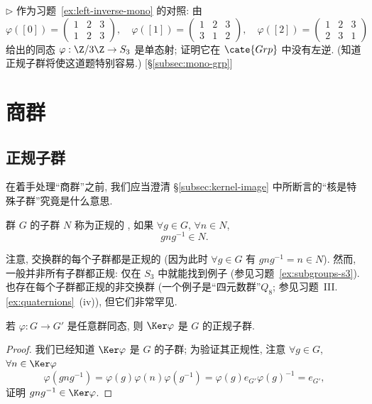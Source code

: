 \begin{prob}
\label{ex:mono-no-left-inverse}
$\triangleright$ 作为习题~\ref{ex:left-inverse-mono} 的对照: 由
\[
\varphi([0]) = \begin{pmatrix} 1 & 2 & 3 \\ 1 & 2 & 3 \end{pmatrix}, \quad \varphi([1]) = \begin{pmatrix} 1 & 2 & 3 \\ 3 & 1 & 2 \end{pmatrix}, \quad \varphi([2]) = \begin{pmatrix} 1 & 2 & 3 \\ 2 & 3 & 1 \end{pmatrix}
\]
给出的同态 $\varphi : \Z/3\Z \to S_3$ 是单态射; 证明它在 $\cate{Grp}$ 中没有左逆. (知道正规子群将使这道题特别容易.) [\S\ref{subsec:mono-grp}]
\end{prob}

\section{商群}
\label{subsec:quotient-groups}

\subsection{正规子群}
\label{subsec:normal-subgroups}

在着手处理``商群''之前, 我们应当澄清 \S\ref{subsec:kernel-image} 中所断言的``核是特殊子群''究竟是什么意思.

\begin{definition}
\label{def:normal-subgroup}
群 $G$ 的子群 $N$ 称为正规的%
, 如果 $\forall g \in G$, $\forall n \in N$,
\[
gng^{-1} \in N.
\]
\end{definition}

注意, 交换群的每个子群都是正规的 (因为此时 $\forall g \in G$ 有 $gng^{-1} = n \in N$). 然而, 一般并非所有子群都正规: 仅在 $S_3$ 中就能找到例子 (参见习题~\ref{ex:subgroups-s3}). 也存在每个子群都正规的非交换群 (一个例子是``四元数群''$Q_8$; 参见习题~III.\ref{ex:quaternions}~(iv)), 但它们非常罕见.

\begin{lemma}
\label{lem:kernel-normal}
若 $\varphi : G \to G'$ 是任意群同态, 则 $\Ker \varphi$ 是 $G$ 的正规子群.
\end{lemma}

\begin{proof}
我们已经知道 $\Ker \varphi$ 是 $G$ 的子群; 为验证其正规性, 注意 $\forall g \in G$, $\forall n \in \Ker \varphi$
\[
\varphi(gng^{-1}) = \varphi(g)\varphi(n)\varphi(g^{-1}) = \varphi(g) e_{G'} \varphi(g)^{-1} = e_{G'},
\]
证明 $gng^{-1} \in \Ker \varphi$.
\end{proof}

